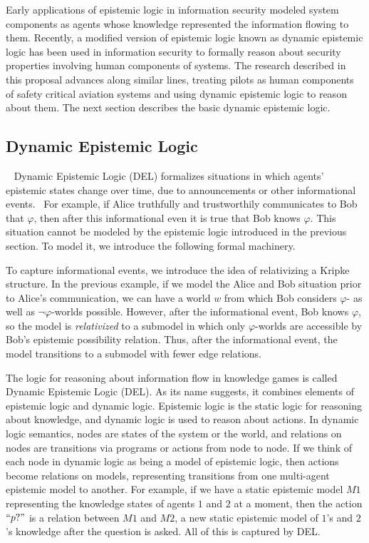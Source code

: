 Early applications of epistemic logic in information security modeled system components as agents whose knowledge represented the information flowing to them. Recently, a modified version of epistemic logic known as dynamic epistemic logic has been used in information security to formally reason about security properties involving human components of systems. The research described in this proposal advances along similar lines, treating pilots as human components of safety critical aviation systems and using dynamic epistemic logic to reason about them. The next section describes the basic dynamic epistemic logic.

\subsection{Dynamic Epistemic Logic}~\label{delsubsection}
Dynamic Epistemic Logic (DEL) formalizes situations in which agents' epistemic states change over time, due to announcements or other informational events.~\cite{DEL} For example, if Alice truthfully and trustworthily communicates to Bob that $\varphi$, then after this informational even it is true that Bob knows $\varphi$. This situation cannot be modeled by the epistemic logic introduced in the previous section. To model it, we introduce the following formal machinery.

To capture informational events, we introduce the idea of relativizing a Kripke structure. In the previous example, if we model the Alice and Bob situation prior to Alice's communication, we can have a world $w$ from which Bob considers $\varphi$- as well as $\neg\varphi$-worlds possible. However, after the informational event, Bob knows $\varphi$, so the model is \emph{relativized} to a submodel in which only $\varphi$-worlds are accessible by Bob's epistemic possibility relation. Thus, after the informational event, the model transitions to a submodel with fewer edge relations.

The logic for reasoning about information flow in knowledge games is called Dynamic Epistemic Logic (DEL). As its name suggests, it combines elements of epistemic logic and dynamic logic. Epistemic logic is the static logic for reasoning about knowledge, and dynamic logic is used to reason about actions. In dynamic logic semantics, nodes are states of the system or the world, and relations on nodes are transitions via programs or actions from node to node. If we think of each node in dynamic logic as being a model of epistemic logic, then actions become relations on models, representing transitions from one multi-agent epistemic model to another. For example, if we have a static epistemic model $M1$ representing the knowledge states of agents $1$ and $2$ at a moment, then the action $``p?"$ is a relation between $M1$ and $M2$, a new static epistemic model of $1$'s and $2$'s knowledge after the question is asked. All of this is captured by DEL.

